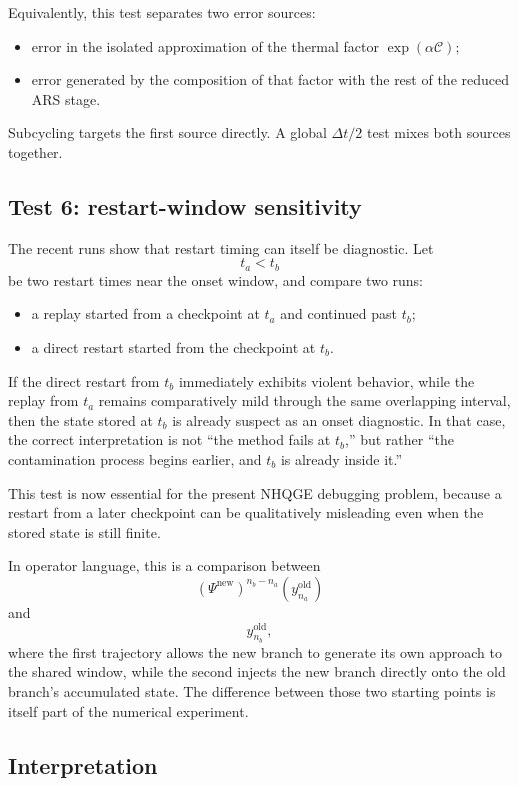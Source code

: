 \documentclass[11pt]{article}
\begin{document}
Equivalently, this test separates two error sources:
\begin{itemize}
\item error in the isolated approximation of the thermal factor
  $\exp(\alpha\mathcal C)$;
\item error generated by the composition of that factor with the rest of the
  reduced ARS stage.
\end{itemize}
Subcycling targets the first source directly. A global $\Delta t/2$ test mixes
both sources together.

\subsection{Test 6: restart-window sensitivity}

The recent runs show that restart timing can itself be diagnostic. Let
\[
t_a < t_b
\]
be two restart times near the onset window, and compare two runs:
\begin{itemize}
\item a replay started from a checkpoint at $t_a$ and continued past $t_b$;
\item a direct restart started from the checkpoint at $t_b$.
\end{itemize}

If the direct restart from $t_b$ immediately exhibits violent behavior, while
the replay from $t_a$ remains comparatively mild through the same overlapping
interval, then the state stored at $t_b$ is already suspect as an onset
diagnostic. In that case, the correct interpretation is not ``the method fails
at $t_b$,'' but rather ``the contamination process begins earlier, and $t_b$ is
already inside it.''

This test is now essential for the present NHQGE debugging problem, because a
restart from a later checkpoint can be qualitatively misleading even when the
stored state is still finite.

In operator language, this is a comparison between
\[
\left(\Psi^{\mathrm{new}}\right)^{n_b-n_a}(y_{n_a}^{\mathrm{old}})
\]
and
\[
y_{n_b}^{\mathrm{old}},
\]
where the first trajectory allows the new branch to generate its own approach
to the shared window, while the second injects the new branch directly onto the
old branch's accumulated state. The difference between those two starting
points is itself part of the numerical experiment.

\subsection{Interpretation}
\end{document}
